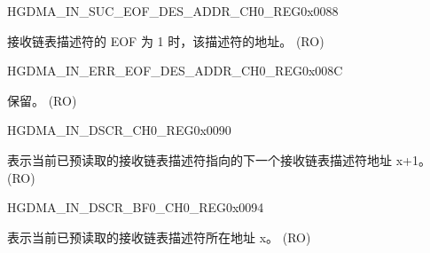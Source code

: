 \begin{register}{H}{GDMA\_IN\_SUC\_EOF\_DES\_ADDR\_CH0\_REG}{0x0088}\label{regdesc:GDMAINSUCEOFDESADDRCH0REG}
%
\regnewline%
\begin{regdesc}\begin{reglist}
\label{fielddesc:GDMAINSUCEOFDESADDRCH0}\item [GDMA\_IN\_SUC\_EOF\_DES\_ADDR\_CH0] 接收链表描述符的 EOF 为 1 时，该描述符的地址。 (RO)
\end{reglist}\end{regdesc}
\end{register}


\begin{register}{H}{GDMA\_IN\_ERR\_EOF\_DES\_ADDR\_CH0\_REG}{0x008C}\label{regdesc:GDMAINERREOFDESADDRCH0REG}
%
\regnewline%
\begin{regdesc}\begin{reglist}
\label{fielddesc:GDMAINERREOFDESADDRCH0}\item [GDMA\_IN\_ERR\_EOF\_DES\_ADDR\_CH0] 保留。 (RO)
\end{reglist}\end{regdesc}
\end{register}


\begin{register}{H}{GDMA\_IN\_DSCR\_CH0\_REG}{0x0090}\label{regdesc:GDMAINDSCRCH0REG}
%
\regnewline%
\begin{regdesc}\begin{reglist}
\label{fielddesc:GDMAINLINKDSCRCH0}\item [GDMA\_INLINK\_DSCR\_CH0] 表示当前已预读取的接收链表描述符指向的下一个接收链表描述符地址 x+1。 (RO)
\end{reglist}\end{regdesc}
\end{register}


\begin{register}{H}{GDMA\_IN\_DSCR\_BF0\_CH0\_REG}{0x0094}\label{regdesc:GDMAINDSCRBF0CH0REG}
%
\regnewline%
\begin{regdesc}\begin{reglist}
\label{fielddesc:GDMAINLINKDSCRBF0CH0}\item [GDMA\_INLINK\_DSCR\_BF0\_CH0] 表示当前已预读取的接收链表描述符所在地址 x。 (RO)
\end{reglist}\end{regdesc}
\end{register}


